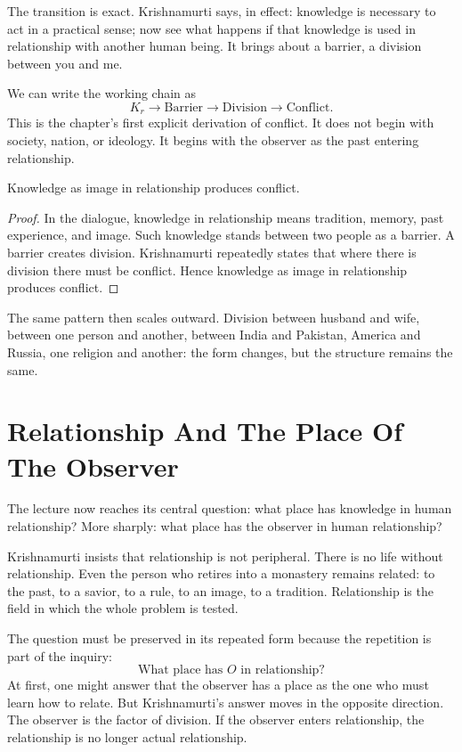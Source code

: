 The transition is exact. Krishnamurti says, in effect: knowledge is necessary to act in a practical sense; now see what happens if that knowledge is used in relationship with another human being. It brings about a barrier, a division between you and me.

We can write the working chain as
\begin{equation}
K_r \longrightarrow \mathrm{Barrier}
\longrightarrow \mathrm{Division}
\longrightarrow \mathrm{Conflict}.
\end{equation}
This is the chapter's first explicit derivation of conflict. It does not begin with society, nation, or ideology. It begins with the observer as the past entering relationship.

\begin{proposition}
Knowledge as image in relationship produces conflict.
\end{proposition}

\begin{proof}
In the dialogue, knowledge in relationship means tradition, memory, past experience, and image. Such knowledge stands between two people as a barrier. A barrier creates division. Krishnamurti repeatedly states that where there is division there must be conflict. Hence knowledge as image in relationship produces conflict.
\end{proof}

The same pattern then scales outward. Division between husband and wife, between one person and another, between India and Pakistan, America and Russia, one religion and another: the form changes, but the structure remains the same.

\section{Relationship And The Place Of The Observer}

The lecture now reaches its central question: what place has knowledge in human relationship? More sharply: what place has the observer in human relationship?

Krishnamurti insists that relationship is not peripheral. There is no life without relationship. Even the person who retires into a monastery remains related: to the past, to a savior, to a rule, to an image, to a tradition. Relationship is the field in which the whole problem is tested.

The question must be preserved in its repeated form because the repetition is part of the inquiry:
\begin{equation}
\text{What place has } O \text{ in relationship?}
\end{equation}
At first, one might answer that the observer has a place as the one who must learn how to relate. But Krishnamurti's answer moves in the opposite direction. The observer is the factor of division. If the observer enters relationship, the relationship is no longer actual relationship.

